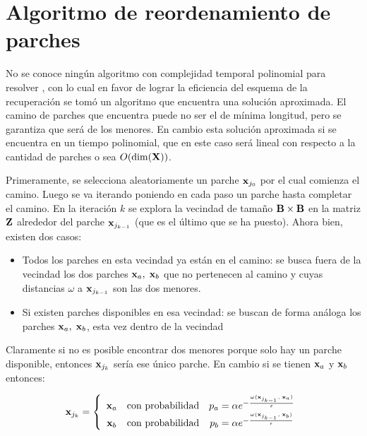 \section{Algoritmo de reordenamiento de parches}

No se conoce ningún algoritmo con complejidad temporal polinomial para resolver \TSP, con lo cual en favor de lograr la eficiencia del esquema de la recuperaci\'on se tom\'o un algoritmo que encuentra una soluci\'on aproximada. El camino de parches que encuentra puede no ser el de m\'inima longitud, pero se garantiza que ser\'a de los menores. En cambio esta soluci\'on aproximada si se encuentra en un tiempo polinomial, que en este caso ser\'a lineal con respecto a la cantidad de parches o sea $O(\dim(\mathbf{X}))$.

Primeramente, se selecciona aleatoriamente un parche $\mathbf{x}_{j_0}$ por el cual comienza el camino. Luego se va iterando poniendo en cada paso un parche hasta completar el camino. En la iteraci\'on $k$ se explora la vecindad de tamaño $\mathbf{B} \times \mathbf{B}$ en la matriz $\mathbf{Z}$ alrededor del parche $\mathbf{x}_{j_{k - 1}}$ (que es el \'ultimo que se ha puesto). Ahora bien, existen dos casos:

\begin{itemize}
\item Todos los parches en esta vecindad ya están en el camino: se busca fuera de la vecindad los dos parches $\mathbf{x}_a,\; \mathbf{x}_b$ que no pertenecen al camino y cuyas distancias $\omega$ a $\mathbf{x}_{j_{k - 1}}$ son las dos menores.

\item Si existen parches disponibles en esa vecindad: se buscan de forma an\'aloga los parches $\mathbf{x}_a,\; \mathbf{x}_b$, esta vez dentro de la vecindad
\end{itemize}

Claramente si no es posible encontrar dos menores porque solo hay un parche disponible, entonces $\mathbf{x}_{j_k}$ ser\'ia ese \'unico parche. En cambio si se tienen $\mathbf{x}_a$ y $\mathbf{x}_b$ entonces:

\begin{equation}
\mathbf{x}_{j_k} = \left\{
	\begin{array}{ccc}
	\mathbf{x}_a &\mbox{con probabilidad}& p_a = \alpha e^{-\frac{\omega(\mathbf{x}_{j_{k - 1}},\; \mathbf{x}_a)}{\epsilon}}\\
	\mathbf{x}_b &\mbox{con probabilidad}& p_b = \alpha e^{-\frac{\omega(\mathbf{x}_{j_{k - 1}},\; \mathbf{x}_b)}{\epsilon}}\\
	\end{array}
\right.
\end{equation}

